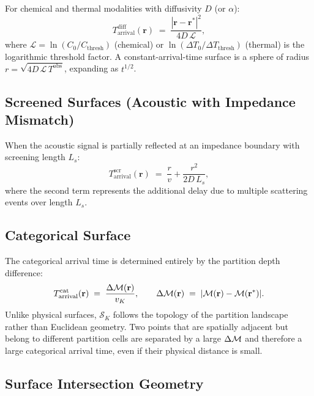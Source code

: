 For chemical and thermal modalities with diffusivity $D$ (or $\alpha$):
\begin{equation}
  T_{\mathrm{arrival}}^{\mathrm{diff}}(\mathbf{r})
  \;=\; \frac{|\mathbf{r} - \mathbf{r}^{*}|^2}{4D\,\mathcal{L}},
  \label{eq:diffusive}
\end{equation}
where $\mathcal{L} = \ln(C_0/C_\mathrm{thresh})$ (chemical) or
$\ln(\Delta T_0/\Delta T_\mathrm{thresh})$ (thermal) is the logarithmic
threshold factor.  A constant-arrival-time surface is a sphere of radius
$r = \sqrt{4D\,\mathcal{L}\,T^\mathrm{obs}}$, expanding as $t^{1/2}$.

\subsection{Screened Surfaces (Acoustic with Impedance Mismatch)}

When the acoustic signal is partially reflected at an impedance boundary
with screening length $L_s$:
\begin{equation}
  T_{\mathrm{arrival}}^{\mathrm{scr}}(\mathbf{r})
  \;=\; \frac{r}{v} + \frac{r^{2}}{2D\,L_s},
  \label{eq:screened}
\end{equation}
where the second term represents the additional delay due to multiple
scattering events over length $L_s$.

\subsection{Categorical Surface}

The categorical arrival time is determined entirely by the partition depth
difference:
\begin{equation}
  T_{\mathrm{arrival}}^{\mathrm{cat}}(\mathbf{r})
  \;=\; \frac{\Delta\mathcal{M}(\mathbf{r})}{v_K},
  \qquad
  \Delta\mathcal{M}(\mathbf{r}) \;=\; |\mathcal{M}(\mathbf{r}) - \mathcal{M}(\mathbf{r}^{*})|.
  \label{eq:categorical-arrival}
\end{equation}
Unlike physical surfaces, $\mathcal{S}_K$ follows the topology of the
partition landscape rather than Euclidean geometry.  Two points that are
spatially adjacent but belong to different partition cells are separated by
a large $\Delta\mathcal{M}$ and therefore a large categorical arrival time, even
if their physical distance is small.

\subsection{Surface Intersection Geometry}

